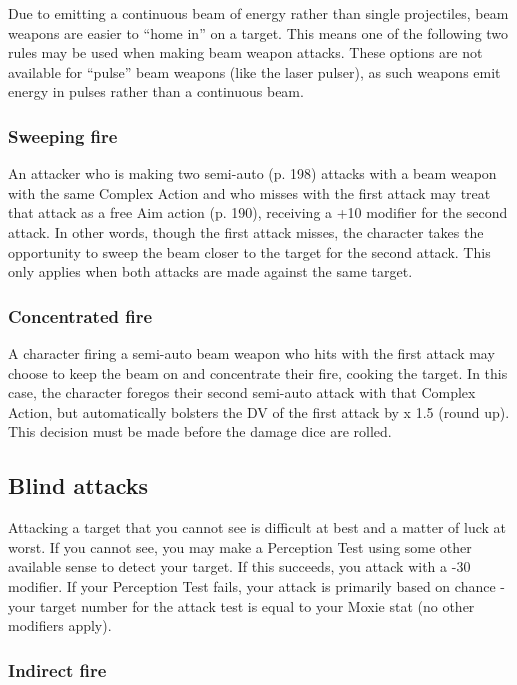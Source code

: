 Due to emitting a continuous beam of energy rather than single projectiles, beam weapons are easier to ``home in'' on a target. This means one of the following two rules may be used when making beam weapon attacks. These options are not available for ``pulse'' beam weapons (like the laser pulser), as such weapons emit energy in pulses rather than a continuous beam.

\subsubsection{Sweeping fire}

An attacker who is making two semi-auto (p. 198) attacks with a beam weapon with the same Complex Action and who misses with the first attack may treat that attack as a free Aim action (p. 190), receiving a +10 modifier for the second attack. In other words, though the first attack misses, the character takes the opportunity to sweep the beam closer to the target for the second attack. This only applies when both attacks are made against the same target.

\subsubsection{Concentrated fire}

A character firing a semi-auto beam weapon who hits with the first attack may choose to keep the beam on and concentrate their fire, cooking the target. In this case, the character foregos their second semi-auto attack with that Complex Action, but automatically bolsters the DV of the first attack by x 1.5 (round up). This decision must be made before the damage dice are rolled.


\subsection{Blind attacks}
\label{sec:blind-attacks}

Attacking a target that you cannot see is difficult at best and a matter of luck at worst. If you cannot see, you may make a Perception Test using some other available sense to detect your target. If this succeeds, you attack with a -30 modifier. If your Perception Test fails, your attack is primarily based on chance - your target number for the attack test is equal to your Moxie stat (no other modifiers apply).

\subsubsection{Indirect fire}

